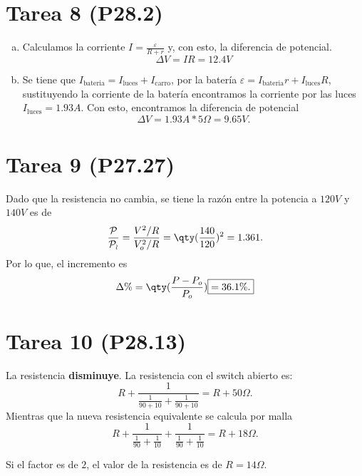 \section*{Tarea 8 (P28.2)}


\begin{enumerate}[a)]
	\item Calculamos la corriente $I = \frac{\varepsilon}{R + r}$ y, con esto, la diferencia de potencial.
		$$ \boxed{ \Delta V = IR = 12.4V } $$
	\item Se tiene que $I_{\text{bateria}} = I_{\text{luces}} + I_{\text{carro}}$, por la batería $\varepsilon = I_{\text{bateria}} r + I_{\text{luces}} R$, sustituyendo la corriente de la batería encontramos la corriente por las luces $I_{\text{luces}} = 1.93A$. Con esto, encontramos la diferencia de potencial
		$$ \boxed{\Delta V = 1.93A*5\Omega = 9.65V .} $$
\end{enumerate}










\section*{Tarea 9 (P27.27)}

Dado que la resistencia no cambia, se tiene la razón entre la potencia a $120V$ y $140V$ es de
	$$ \frac{\mathcal{P}}{\mathcal{P_o}} = \frac{V^2 /R}{V_o ^2 /R} = \qty(\frac{140}{120})^2 = 1.361. $$
Por lo que, el incremento es
	$$ \Delta \% = \qty(\frac{P - P_o}{P_o}) \boxed{ = 36.1\% .} $$







\section*{Tarea 10 (P28.13)}


La resistencia \textbf{disminuye}. La resistencia con el switch abierto es:
	$$ R + \frac{1}{\frac{1}{90 + 10} + \frac{1}{90 + 10}} = R + 50\Omega . $$
	Mientras que la nueva resistencia equivalente se calcula por malla
	$$ R + \frac{1}{\frac{1}{90} + \frac{1}{10}} + \frac{1}{\frac{1}{90} + \frac{1}{10}} = R + 18\Omega . $$

Si el factor es de $2$, el valor de la resistencia es de $R = 14\Omega$.










